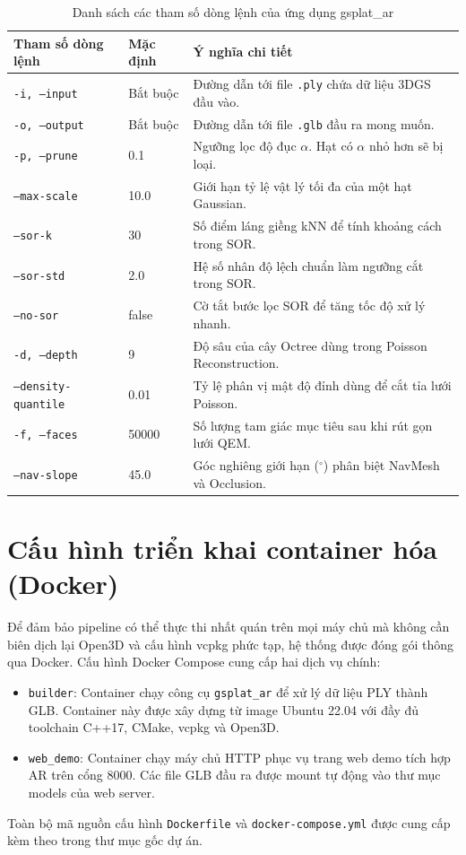\documentclass[a4paper,12pt]{report}
\begin{document}
\begin{table}[H]
\centering
\small
\renewcommand{\arraystretch}{1.25}
\begin{tabularx}{\textwidth}{|l|l|X|}
\hline
\textbf{Tham số dòng lệnh} & \textbf{Mặc định} & \textbf{Ý nghĩa chi tiết} \\ \hline
\texttt{-i, --input} & Bắt buộc & Đường dẫn tới file \texttt{.ply} chứa dữ liệu 3DGS đầu vào. \\ \hline
\texttt{-o, --output} & Bắt buộc & Đường dẫn tới file \texttt{.glb} đầu ra mong muốn. \\ \hline
\texttt{-p, --prune} & 0.1 & Ngưỡng lọc độ đục $\alpha$. Hạt có $\alpha$ nhỏ hơn sẽ bị loại. \\ \hline
\texttt{--max-scale} & 10.0 & Giới hạn tỷ lệ vật lý tối đa của một hạt Gaussian. \\ \hline
\texttt{--sor-k} & 30 & Số điểm láng giềng kNN để tính khoảng cách trong SOR. \\ \hline
\texttt{--sor-std} & 2.0 & Hệ số nhân độ lệch chuẩn làm ngưỡng cắt trong SOR. \\ \hline
\texttt{--no-sor} & false & Cờ tắt bước lọc SOR để tăng tốc độ xử lý nhanh. \\ \hline
\texttt{-d, --depth} & 9 & Độ sâu của cây Octree dùng trong Poisson Reconstruction. \\ \hline
\texttt{--density-quantile} & 0.01 & Tỷ lệ phân vị mật độ đỉnh dùng để cắt tỉa lưới Poisson. \\ \hline
\texttt{-f, --faces} & 50000 & Số lượng tam giác mục tiêu sau khi rút gọn lưới QEM. \\ \hline
\texttt{--nav-slope} & 45.0 & Góc nghiêng giới hạn ($^\circ$) phân biệt NavMesh và Occlusion. \\ \hline
\end{tabularx}
\caption{Danh sách các tham số dòng lệnh của ứng dụng gsplat\_ar}
\label{tab:cli_params}
\end{table}

\section{Cấu hình triển khai container hóa (Docker)}
Để đảm bảo pipeline có thể thực thi nhất quán trên mọi máy chủ mà không cần biên dịch lại Open3D và cấu hình vcpkg phức tạp, hệ thống được đóng gói thông qua Docker. Cấu hình Docker Compose cung cấp hai dịch vụ chính:
\begin{itemize}
    \item \texttt{builder}: Container chạy công cụ \texttt{gsplat\_ar} để xử lý dữ liệu PLY thành GLB. Container này được xây dựng từ image Ubuntu 22.04 với đầy đủ toolchain C++17, CMake, vcpkg và Open3D.
    \item \texttt{web\_demo}: Container chạy máy chủ HTTP phục vụ trang web demo tích hợp AR trên cổng 8000. Các file GLB đầu ra được mount tự động vào thư mục models của web server.
\end{itemize}
Toàn bộ mã nguồn cấu hình \texttt{Dockerfile} và \texttt{docker-compose.yml} được cung cấp kèm theo trong thư mục gốc dự án.
\end{document}
